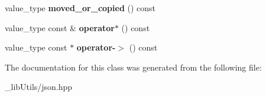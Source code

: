 \begin{DoxyCompactItemize}
\item 
value\+\_\+type {\bfseries moved\+\_\+or\+\_\+copied} () const \hypertarget{classnlohmann_1_1detail_1_1json__ref_ab82818e9b8cc63cb76e61fe6b68959a5}{}\label{classnlohmann_1_1detail_1_1json__ref_ab82818e9b8cc63cb76e61fe6b68959a5}

\item 
value\+\_\+type const \& {\bfseries operator$\ast$} () const \hypertarget{classnlohmann_1_1detail_1_1json__ref_adec75260903212a3bf1235fced3f2e51}{}\label{classnlohmann_1_1detail_1_1json__ref_adec75260903212a3bf1235fced3f2e51}

\item 
value\+\_\+type const $\ast$ {\bfseries operator-\/$>$} () const \hypertarget{classnlohmann_1_1detail_1_1json__ref_ae4492a0e856ba9bb8739e9bba988a8c6}{}\label{classnlohmann_1_1detail_1_1json__ref_ae4492a0e856ba9bb8739e9bba988a8c6}

\end{DoxyCompactItemize}


The documentation for this class was generated from the following file\+:\begin{DoxyCompactItemize}
\item 
\+\_\+lib\+Utils/json.\+hpp\end{DoxyCompactItemize}
